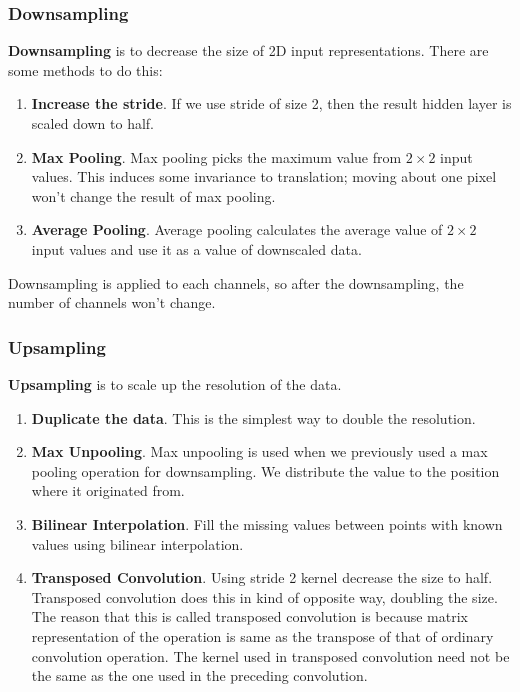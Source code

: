 \documentclass{article}
\begin{document}
        \subsubsection{Downsampling}
            \textbf{Downsampling} is to decrease the size of 2D input representations.
            There are some methods to do this:
            \begin{enumerate}
                \item \textbf{Increase the stride}. If we use stride of size 2, then the result hidden layer is scaled down to half.
                \item \textbf{Max Pooling}. Max pooling picks the maximum value from $2 \times 2$ input values. This induces some invariance to translation; moving about one pixel won't change the result of max pooling.
                \item \textbf{Average Pooling}. Average pooling calculates the average value of $2 \times 2$ input values and use it as a value of downscaled data.
            \end{enumerate}
            Downsampling is applied to each channels, so after the downsampling, the number of channels won't change.
        \subsubsection{Upsampling}
            \textbf{Upsampling} is to scale up the resolution of the data.
            \begin{enumerate}
                \item \textbf{Duplicate the data}. This is the simplest way to double the resolution.
                \item \textbf{Max Unpooling}. Max unpooling is used when we previously used a max pooling operation for downsampling.
                    We distribute the value to the position where it originated from.
                \item \textbf{Bilinear Interpolation}. Fill the missing values between points with known values using bilinear interpolation.
                \item \textbf{Transposed Convolution}. Using stride 2 kernel decrease the size to half. Transposed convolution does this in kind of opposite way, doubling the size.
                    The reason that this is called transposed convolution is because matrix representation of the operation
                    is same as the transpose of that of ordinary convolution operation.
                    The kernel used in transposed convolution need not be the same as the one used in the preceding convolution.
            \end{enumerate}
\end{document}
